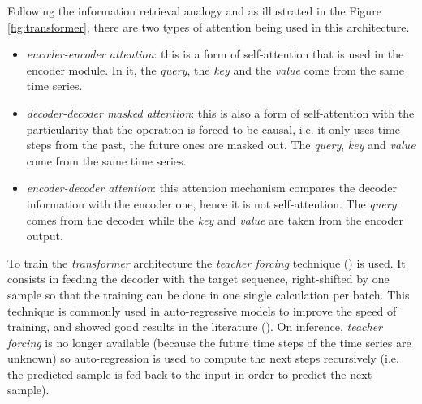 Following the information retrieval analogy and as illustrated in the Figure \ref{fig:transformer}, there are two types of attention being used in this architecture.
\begin{itemize}
	\item \textit{encoder-encoder attention}: this is a form of self-attention that is used in the encoder module. In it, the \textit{query}, the \textit{key} and the \textit{value} come from the same time series.
	\item \textit{decoder-decoder masked attention}: this is also a form of self-attention with the particularity that the operation is forced to be causal, i.e. it only uses time steps from the past, the future ones are masked out. The \textit{query}, \textit{key} and \textit{value} come from the same time series.
	\item \textit{encoder-decoder attention}: this attention mechanism compares the decoder information with the encoder one, hence it is not self-attention. The \textit{query} comes from the decoder while the \textit{key} and \textit{value} are taken from the encoder output.
\end{itemize}

To train the \textit{transformer} architecture the \textit{teacher forcing} technique (\cite{williams1989, goyal2016}) is used. It consists in feeding the decoder with the target sequence, right-shifted by one sample so that the training can be done in one single calculation per batch. This technique is commonly used in auto-regressive models to improve the speed of training, and showed good results in the literature (\cite{vaswani2017}). On inference, \textit{teacher forcing} is no longer available (because the future time steps of the time series are unknown) so auto-regression is used to compute the next steps recursively (i.e. the predicted sample is fed back to the input in order to predict the next sample).


